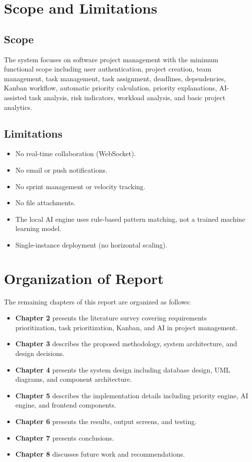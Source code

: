 \documentclass[12pt,a4paper,oneside]{report}
\begin{document}
\section{Scope and Limitations}

\subsection{Scope}
The system focuses on software project management with the minimum functional scope including user authentication, project creation, team management, task management, task assignment, deadlines, dependencies, Kanban workflow, automatic priority calculation, priority explanations, AI-assisted task analysis, risk indicators, workload analysis, and basic project analytics.

\subsection{Limitations}
\begin{itemize}[noitemsep]
  \item No real-time collaboration (WebSocket).
  \item No email or push notifications.
  \item No sprint management or velocity tracking.
  \item No file attachments.
  \item The local AI engine uses rule-based pattern matching, not a trained machine learning model.
  \item Single-instance deployment (no horizontal scaling).
\end{itemize}

\section{Organization of Report}

The remaining chapters of this report are organized as follows:
\begin{itemize}[noitemsep]
  \item \textbf{Chapter 2} presents the literature survey covering requirements prioritization, task prioritization, Kanban, and AI in project management.
  \item \textbf{Chapter 3} describes the proposed methodology, system architecture, and design decisions.
  \item \textbf{Chapter 4} presents the system design including database design, UML diagrams, and component architecture.
  \item \textbf{Chapter 5} describes the implementation details including priority engine, AI engine, and frontend components.
  \item \textbf{Chapter 6} presents the results, output screens, and testing.
  \item \textbf{Chapter 7} presents conclusions.
  \item \textbf{Chapter 8} discusses future work and recommendations.
\end{itemize}
\end{document}
